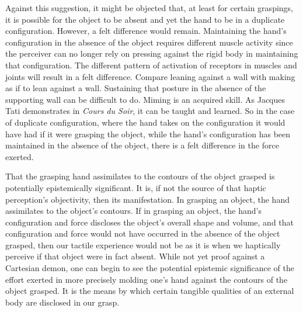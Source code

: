 Against this suggestion, it might be objected that, at least for certain graspings, it is possible for the object to be absent and yet the hand to be in a duplicate configuration. However, a felt difference would remain. Maintaining the hand's configuration in the absence of the object requires different muscle activity since the perceiver can no longer rely on pressing against the rigid body in maintaining that configuration. The different pattern of activation of receptors in muscles and joints will result in a felt difference. Compare leaning against a wall with making as if to lean against a wall. Sustaining that posture in the absence of the supporting wall can be difficult to do. Miming is an acquired skill. As Jacques Tati demonstrates in \emph{Cours du Soir}, it can be taught and learned. So in the case of duplicate configuration, where the hand takes on the configuration it would have had if it were grasping the object, while the hand's configuration has been maintained in the absence of the object, there is a felt difference in the force exerted.

That the grasping hand assimilates to the contours of the object grasped is potentially epistemically significant. It is, if not the source of that haptic perception's objectivity, then its manifestation. In grasping an object, the hand assimilates to the object's contours. If in grasping an object, the hand's configuration and force discloses the object's overall shape and volume, and that configuration and force would not have occurred in the absence of the object grasped, then our tactile experience would not be as it is when we haptically perceive if that object were in fact absent. While not yet proof against a Cartesian demon, one can begin to see the potential epistemic significance of the effort exerted in more precisely molding one's hand against the contours of the object grasped. It is the means by which certain tangible qualities of an external body are disclosed in our grasp. 

